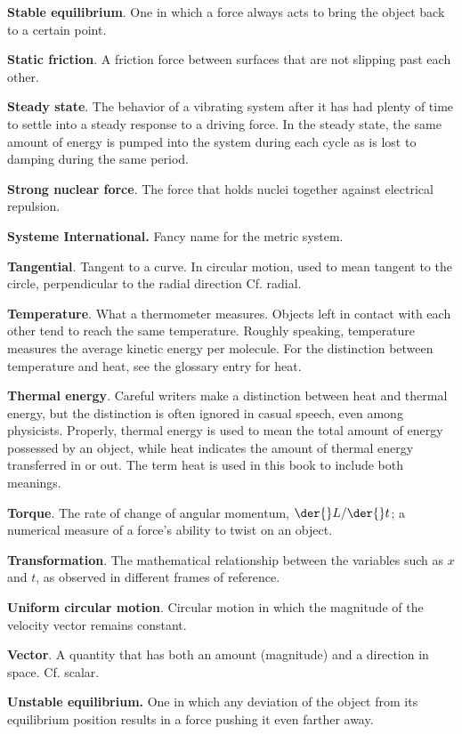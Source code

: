 \textbf{Stable equilibrium}. One in which a force always acts to bring the object back to a certain point. 

\textbf{Static friction}. A friction force between surfaces that are not slipping past each other. 

\textbf{Steady state}. The behavior of a vibrating system after it has had plenty of time to settle into a
steady response
to a driving force. In the steady state, the same amount of energy is pumped into the system during each
cycle as is
lost to damping during the same period. 

\textbf{Strong nuclear force}. The force that holds nuclei together against electrical repulsion. 

\textbf{Systeme International.} Fancy name for the metric system. 

\textbf{Tangential}. Tangent to a curve. In circular motion, used to mean tangent to the circle, perpendicular
to the
radial direction Cf. radial. 

\textbf{Temperature}. What a thermometer measures. Objects left in contact with each other tend to reach the
same
temperature. Roughly speaking, temperature measures the average kinetic energy per molecule. For the
distinction between
temperature and heat, see the glossary entry for heat. 

\textbf{Thermal energy}. Careful writers make a distinction between heat and thermal energy, but the
distinction is often
ignored in casual speech, even among physicists. Properly, thermal energy is used to mean the total amount
of energy
possessed by an object, while heat indicates the amount of thermal energy transferred in or out. The term
heat is used in
this book to include both meanings. 

\textbf{Torque}. The rate of change of angular momentum, $\der{}L/\der{}t$; a numerical measure of a force's ability to twist on
an object.


\textbf{Transformation}. The mathematical relationship between the variables such as $x$ and $t$, as observed in
different frames of reference.

\textbf{Uniform circular motion}. Circular motion in which the magnitude of the velocity vector remains
constant.


\textbf{Vector}. A quantity that has both an amount (magnitude) and a direction in space. Cf. scalar. 

\textbf{Unstable equilibrium.} One in which any deviation of the object from its equilibrium position results
in a force
pushing it even farther away. 

